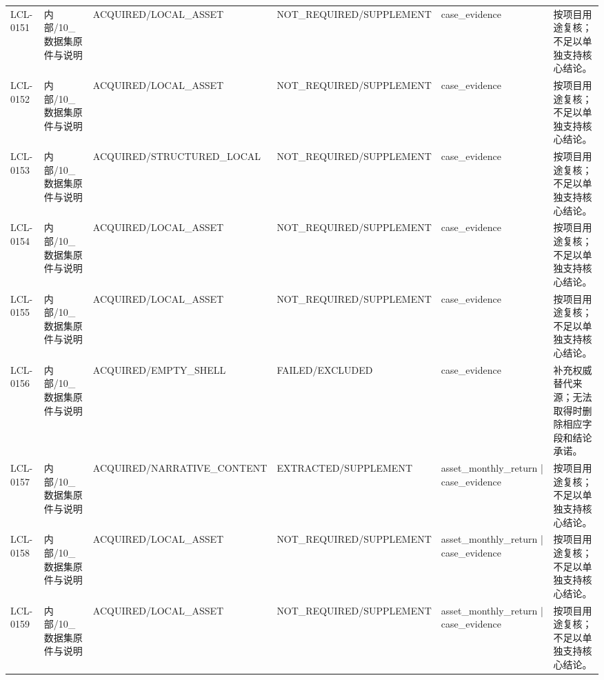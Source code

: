 \begin{landscape}
\begin{longtable}{p{1.8cm}p{2.6cm}p{2.6cm}p{2.6cm}p{4.8cm}p{7.2cm}}
LCL-0151 & 内部/\allowbreak{}10\_\allowbreak{}数据集原件与说明 & ACQUIRED/\allowbreak{}LOCAL\_\allowbreak{}ASSET & NOT\_\allowbreak{}REQUIRED/\allowbreak{}SUPPLEMENT & case\_\allowbreak{}evidence & 按项目用途复核；不足以单独支持核心结论。\\
LCL-0152 & 内部/\allowbreak{}10\_\allowbreak{}数据集原件与说明 & ACQUIRED/\allowbreak{}LOCAL\_\allowbreak{}ASSET & NOT\_\allowbreak{}REQUIRED/\allowbreak{}SUPPLEMENT & case\_\allowbreak{}evidence & 按项目用途复核；不足以单独支持核心结论。\\
LCL-0153 & 内部/\allowbreak{}10\_\allowbreak{}数据集原件与说明 & ACQUIRED/\allowbreak{}STRUCTURED\_\allowbreak{}LOCAL & NOT\_\allowbreak{}REQUIRED/\allowbreak{}SUPPLEMENT & case\_\allowbreak{}evidence & 按项目用途复核；不足以单独支持核心结论。\\
LCL-0154 & 内部/\allowbreak{}10\_\allowbreak{}数据集原件与说明 & ACQUIRED/\allowbreak{}LOCAL\_\allowbreak{}ASSET & NOT\_\allowbreak{}REQUIRED/\allowbreak{}SUPPLEMENT & case\_\allowbreak{}evidence & 按项目用途复核；不足以单独支持核心结论。\\
LCL-0155 & 内部/\allowbreak{}10\_\allowbreak{}数据集原件与说明 & ACQUIRED/\allowbreak{}LOCAL\_\allowbreak{}ASSET & NOT\_\allowbreak{}REQUIRED/\allowbreak{}SUPPLEMENT & case\_\allowbreak{}evidence & 按项目用途复核；不足以单独支持核心结论。\\
LCL-0156 & 内部/\allowbreak{}10\_\allowbreak{}数据集原件与说明 & ACQUIRED/\allowbreak{}EMPTY\_\allowbreak{}SHELL & FAILED/\allowbreak{}EXCLUDED & case\_\allowbreak{}evidence & 补充权威替代来源；无法取得时删除相应字段和结论承诺。\\
LCL-0157 & 内部/\allowbreak{}10\_\allowbreak{}数据集原件与说明 & ACQUIRED/\allowbreak{}NARRATIVE\_\allowbreak{}CONTENT & EXTRACTED/\allowbreak{}SUPPLEMENT & asset\_\allowbreak{}monthly\_\allowbreak{}return | case\_\allowbreak{}evidence & 按项目用途复核；不足以单独支持核心结论。\\
LCL-0158 & 内部/\allowbreak{}10\_\allowbreak{}数据集原件与说明 & ACQUIRED/\allowbreak{}LOCAL\_\allowbreak{}ASSET & NOT\_\allowbreak{}REQUIRED/\allowbreak{}SUPPLEMENT & asset\_\allowbreak{}monthly\_\allowbreak{}return | case\_\allowbreak{}evidence & 按项目用途复核；不足以单独支持核心结论。\\
LCL-0159 & 内部/\allowbreak{}10\_\allowbreak{}数据集原件与说明 & ACQUIRED/\allowbreak{}LOCAL\_\allowbreak{}ASSET & NOT\_\allowbreak{}REQUIRED/\allowbreak{}SUPPLEMENT & asset\_\allowbreak{}monthly\_\allowbreak{}return | case\_\allowbreak{}evidence & 按项目用途复核；不足以单独支持核心结论。\\

\end{longtable}
\end{landscape}
